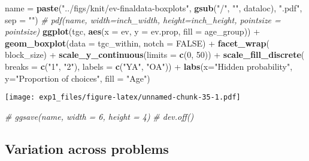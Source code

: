 \documentclass[11pt,,]{article}
\newenvironment{Shaded}{\begin{snugshade}}{\end{snugshade}}
\newcommand{\KeywordTok}[1]{\textcolor[rgb]{0.13,0.29,0.53}{\textbf{{#1}}}}
\newcommand{\DataTypeTok}[1]{\textcolor[rgb]{0.13,0.29,0.53}{{#1}}}
\newcommand{\DecValTok}[1]{\textcolor[rgb]{0.00,0.00,0.81}{{#1}}}
\newcommand{\StringTok}[1]{\textcolor[rgb]{0.31,0.60,0.02}{{#1}}}
\newcommand{\CommentTok}[1]{\textcolor[rgb]{0.56,0.35,0.01}{\textit{{#1}}}}
\newcommand{\OtherTok}[1]{\textcolor[rgb]{0.56,0.35,0.01}{{#1}}}
\newcommand{\NormalTok}[1]{{#1}}
\begin{document}
\begin{Shaded}
\begin{Highlighting}[]
\NormalTok{name =}\StringTok{ }\KeywordTok{paste}\NormalTok{(}\StringTok{"../figs/knit/ev-finaldata-boxplots"}\NormalTok{, }
             \KeywordTok{gsub}\NormalTok{(}\StringTok{"/"}\NormalTok{, }\StringTok{""}\NormalTok{, dataloc), }\StringTok{".pdf"}\NormalTok{, }\DataTypeTok{sep =} \StringTok{""}\NormalTok{)}
\CommentTok{# pdf(name, width=inch_width, height=inch_height, pointsize = pointsize)}
\KeywordTok{ggplot}\NormalTok{(tgc, }\KeywordTok{aes}\NormalTok{(}\DataTypeTok{x =} \NormalTok{ev, }\DataTypeTok{y =} \NormalTok{ev.prop, }\DataTypeTok{fill =} \NormalTok{age_group)) +}\StringTok{ }
\StringTok{  }\KeywordTok{geom_boxplot}\NormalTok{(}\DataTypeTok{data =} \NormalTok{tgc_within, }\DataTypeTok{notch =} \OtherTok{FALSE}\NormalTok{) +}\StringTok{ }
\StringTok{  }\KeywordTok{facet_wrap}\NormalTok{(~}\StringTok{ }\NormalTok{block_size) +}\StringTok{ }
\StringTok{  }\KeywordTok{scale_y_continuous}\NormalTok{(}\DataTypeTok{limits =} \KeywordTok{c}\NormalTok{(}\DecValTok{0}\NormalTok{, }\DecValTok{50}\NormalTok{)) +}\StringTok{ }
\StringTok{  }\KeywordTok{scale_fill_discrete}\NormalTok{(}
    \DataTypeTok{breaks =} \KeywordTok{c}\NormalTok{(}\StringTok{"1"}\NormalTok{, }\StringTok{"2"}\NormalTok{),}
    \DataTypeTok{labels =} \KeywordTok{c}\NormalTok{(}\StringTok{"YA"}\NormalTok{, }\StringTok{"OA"}\NormalTok{)) +}\StringTok{ }
\StringTok{  }\KeywordTok{labs}\NormalTok{(}\DataTypeTok{x=}\StringTok{"Hidden probability"}\NormalTok{, }\DataTypeTok{y=}\StringTok{"Proportion of choices"}\NormalTok{, }\DataTypeTok{fill =} \StringTok{"Age"}\NormalTok{)}
\end{Highlighting}
\end{Shaded}

\texttt{[image: exp1\_files/figure-latex/unnamed-chunk-35-1.pdf]}

\begin{Shaded}
\begin{Highlighting}[]
\CommentTok{# ggsave(name, width = 6, height = 4)}
\CommentTok{# dev.off()}
\end{Highlighting}
\end{Shaded}

\newpage

\newpage

\subsection{Variation across problems}\label{variation-across-problems}
\end{document}
